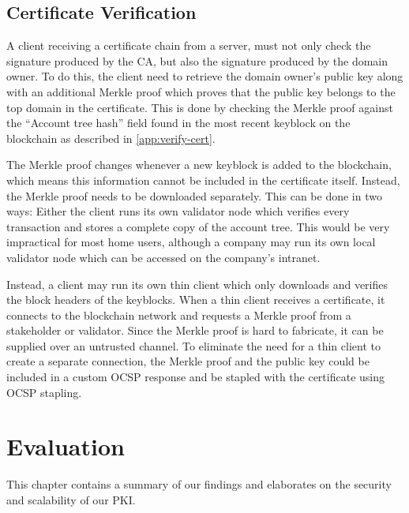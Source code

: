\documentclass{style/kththesis}
\begin{document}
\section{Certificate Verification}
A client receiving a certificate chain from a server, must not only check the signature produced by the CA, but also the signature produced by the domain owner. To do this, the client need to retrieve the domain owner's public key along with an additional Merkle proof which proves that the public key belongs to the top domain in the certificate. This is done by checking the Merkle proof against the ``Account tree hash'' field found in the most recent keyblock on the blockchain as described in \cref{app:verify-cert}. 

The Merkle proof changes whenever a new keyblock is added to the blockchain, which means this information cannot be included in the certificate itself. Instead, the Merkle proof needs to be downloaded separately. This can be done in two ways: Either the client runs its own validator node which verifies every transaction and stores a complete copy of the account tree. This would be very impractical for most home users, although a company may run its own local validator node which can be accessed on the company's intranet. 

Instead, a client may run its own thin client which only downloads and verifies the block headers of the keyblocks. When a thin client receives a certificate, it connects to the blockchain network and requests a Merkle proof from a stakeholder or validator. Since the Merkle proof is hard to fabricate, it can be supplied over an untrusted channel. To eliminate the need for a thin client to create a separate connection, the Merkle proof and the public key could be included in a custom OCSP response and be stapled with the certificate using OCSP stapling.

\chapter{Evaluation}
\label{chap:evaluation}
This chapter contains a summary of our findings and elaborates on the security and scalability of our PKI.
\end{document}

